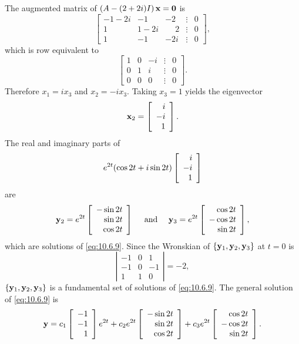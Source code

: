 \begin{examplesolution}
The augmented matrix of $\left(A-(2+2i)I\right){\bf x=0}$ is
\[
  \left[
  \begin{array}{ccrcc}
    -1-2i & -1   & -2           & \vdots & 0 \\
    1     & 1-2i & \phantom{-}2 & \vdots & 0 \\
    1     & -1   & -2i          & \vdots & 0
  \end{array}\right],
\]
which is row equivalent to
\[
  \left[
  \begin{array}{rrrcr}
    1 & 0 & -i & \vdots & 0 \\
    0 & 1 & i  & \vdots & 0 \\
    0 & 0 & 0  & \vdots & 0
  \end{array}\right].
\]
Therefore $x_{1}=ix_{3}$ and $x_{2}=-ix_{3}$. Taking $x_{3}=1$ yields the eigenvector
\[
  {\bf x}_{2}=\left[\begin{array}{r}i\\-i\\1\end{array}\right]. \]
The real and imaginary parts of
\[
  e^{2t}(\cos2t+i\sin2t)\left[\begin{array}{r}i\\-i\\1\end{array}\right]
\]
are
\[
  {\bf y}_{2}=e^{2t}\left[
  \begin{array}{r}
    -\sin2t \\
    \sin2t  \\
    \cos 2t
  \end{array}\right]\quad\mbox{ and }\quad{\bf y}_{3}=e^{2t}\left[
  \begin{array}{r}
    \cos2t  \\
    -\cos2t \\
    \sin 2t
  \end{array}\right],
\]
which are solutions of \eqref{eq:10.6.9}. Since the Wronskian of
$\{{\bf y}_{1},{\bf y}_{2},{\bf y}_{3}\}$ at $t=0$ is
\[
  \left|
  \begin{array}{rrr}
    -1 & 0 & 1  \\
    -1 & 0 & -1 \\
    1  & 1 & 0
  \end{array}\right|=-2,
\]
$\{{\bf y}_{1},{\bf y}_{2},{\bf y}_{3}\}$ is a fundamental set of solutions of \eqref{eq:10.6.9}.
The general solution of \eqref{eq:10.6.9} is
\[
  {\bf y}=c_{1}\left[\begin{array}{r}-1\\-1\\1\end{array}\right]e^{2t}+ c_{2}e^{2t}\left[
  \begin{array}{r}
    -\sin2t \\
    \sin2t  \\
    \cos 2t
  \end{array}\right]+ c_{3}e^{2t}\left[
  \begin{array}{r}
    \cos2t  \\
    -\cos2t \\
    \sin 2t
  \end{array}\right].
\]
\end{examplesolution}

